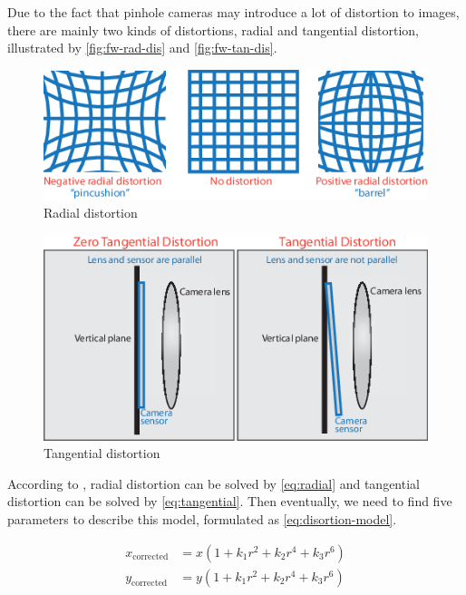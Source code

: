 Due to the fact that pinhole cameras may introduce a lot of distortion to
images, there are mainly two kinds of distortions, radial and tangential
distortion, illustrated by \autoref{fig:fw-rad-dis} and
\autoref{fig:fw-tan-dis}.

\begin{figure}
    \begin{center}
        \includegraphics[scale=0.8]{figures/framework_calibration_radial_distortion.png}
    \end{center}
    \caption{Radial distortion}
    \label{fig:fw-rad-dis}
\end{figure}

\begin{figure}
    \begin{center}
        \includegraphics[scale=0.8]{figures/framework_calibration_tangentialdistortion.png}
    \end{center}
    \caption{Tangential distortion}
    \label{fig:fw-tan-dis}
\end{figure}

According to \cite{paper-camera-calibration}, radial distortion can be solved by
\autoref{eq:radial} and tangential distortion can be solved by
\autoref{eq:tangential}. Then eventually, we need to find five parameters to
describe this model, formulated as \autoref{eq:disortion-model}.

\begin{equation}
\begin{aligned} x_{\text {corrected}} &=x\left(1+k_{1} r^{2}+k_{2} r^{4}+k_{3}
r^{6}\right) \\ y_{\text {corrected}} &=y\left(1+k_{1} r^{2}+k_{2} r^{4}+k_{3}
r^{6}\right) \end{aligned}
\label{eq:radial}
\end{equation}

